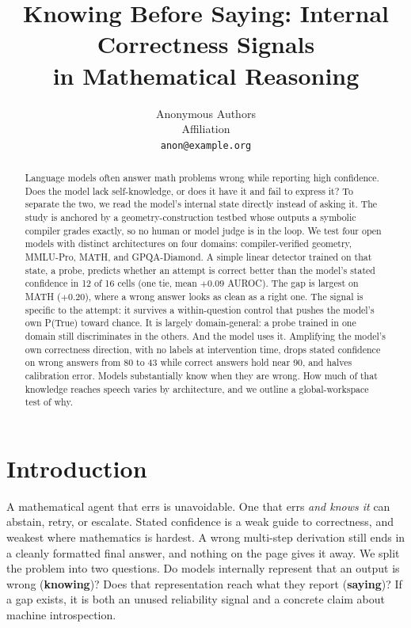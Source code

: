 \documentclass{article}
\title{Knowing Before Saying: Internal Correctness Signals \\ in Mathematical Reasoning}
\author{%
  Anonymous Authors\\
  Affiliation\\
  \texttt{anon@example.org}
}
\begin{document}
\maketitle

\begin{abstract}
Language models often answer math problems wrong while reporting high confidence.
Does the model lack self-knowledge, or does it have it and fail to express it?
To separate the two, we read the model's internal state directly instead of asking it.
The study is anchored by a geometry-construction testbed whose outputs a symbolic compiler grades exactly, so no human or model judge is in the loop.
We test four open models with distinct architectures on four domains: compiler-verified geometry, MMLU-Pro, MATH, and GPQA-Diamond.
A simple linear detector trained on that state, a probe, predicts whether an attempt is correct better than the model's stated confidence in 12 of 16 cells (one tie, mean $+0.09$ AUROC).
The gap is largest on MATH ($+0.20$), where a wrong answer looks as clean as a right one.
The signal is specific to the attempt: it survives a within-question control that pushes the model's own P(True) toward chance.
It is largely domain-general: a probe trained in one domain still discriminates in the others.
And the model uses it.
Amplifying the model's own correctness direction, with no labels at intervention time, drops stated confidence on wrong answers from 80 to 43 while correct answers hold near 90, and halves calibration error.
Models substantially know when they are wrong.
How much of that knowledge reaches speech varies by architecture, and we outline a global-workspace test of why.
\end{abstract}

\section{Introduction}
\label{sec:intro}

A mathematical agent that errs is unavoidable.
One that errs \emph{and knows it} can abstain, retry, or escalate.
Stated confidence is a weak guide to correctness, and weakest where mathematics is hardest.
A wrong multi-step derivation still ends in a cleanly formatted final answer, and nothing on the page gives it away.
We split the problem into two questions.
Do models internally represent that an output is wrong (\textbf{knowing})?
Does that representation reach what they report (\textbf{saying})?
If a gap exists, it is both an unused reliability signal and a concrete claim about machine introspection.
\end{document}
